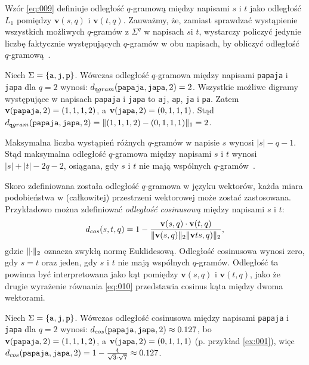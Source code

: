 \documentclass{praca1}
\DeclarePairedDelimiter{\norm}{\lVert}{\rVert}
\begin{document}
Wzór \ref{eq:009} definiuje odległość $q$-gramową między napisami $s$ i $t$ jako odległość $L_1$ pomiędzy $\mathbf{v}(s,q)$ i $\mathbf{v}(t,q)$. Zauważmy, że, zamiast sprawdzać wystąpienie wszystkich możliwych $q$-gramów z $\Sigma^q$ w napisach $s$i $t$, wystarczy policzyć jedynie liczbę faktycznie występujących $q$-gramów w obu napisach, by obliczyć odległość $q$-gramową~\cite{Loo2014:stringdist}.

\begin{example}
\label{ex:001}
Niech $\Sigma = \{\verb|a|, \verb|j|, \verb|p|\}$. Wówczas odległość $q$-gramowa między napisami \verb|papaja| i \verb|japa| dla $q = 2$ wynosi: $d_{\mathtt{q}gram}(\verb|papaja|, \verb|japa|, 2) = 2$. Wszystkie możliwe digramy występujące w napisach  \verb|papaja| i \verb|japa| to \verb|aj|, \verb|ap|, \verb|ja| i \verb|pa|. Zatem $\mathbf{v}( \verb|papaja|,2) = (1, 1, 1, 2)$, a  $\mathbf{v}( \verb|japa|,2) = (0, 1, 1, 1)$. Stąd $d_{\mathtt{q}gram}(\verb|papaja|, \verb|japa|, 2) =  \norm{(1,1,1,2) - (0,1,1,1)}_1 = 2$.
\end{example}


Maksymalna liczba wystąpień różnych $q$-gramów w napisie $s$ wynosi $|s| - q - 1$. Stąd maksymalna odległość $q$-gramowa między napisami $s$ i $t$ wynosi $|s| + |t| - 2q - 2$, osiągana, gdy $s$ i $t$ nie mają wspólnych $q$-gramów~\cite{Loo2014:stringdist}.

Skoro zdefiniowana została odległość $q$-gramowa w języku wektorów, każda miara podobieństwa w (całkowitej) przestrzeni wektorowej może zostać zastosowana. Przykładowo można zdefiniować \emph{odległość cosinusową} między napisami $s$ i $t$:
\begin{equation}
\label{eq:010}
d_{cos}(s,t,q) = 1 - \frac{ \mathbf{v}(s,q) \cdot \mathbf{v}(t,q) }{ \norm{\mathbf{v}(s,q)}_2  \norm{\mathbf{v}ts,q)}_2 },
\end{equation}
gdzie $\norm{\cdot}_2$ oznacza zwykłą normę Euklidesową. Odległość cosinusowa wynosi zero, gdy $s=t$ oraz jeden, gdy $s$ i $t$ nie mają wspólnych $q$-gramów. Odległość ta powinna być interpretowana jako kąt pomiędzy $\mathbf{v}(s,q)$ i $\mathbf{v}(t,q)$, jako że drugie wyrażenie równania \ref{eq:010} przedstawia cosinus kąta między dwoma wektorami.

\begin{example}
Niech $\Sigma = \{\verb|a|, \verb|j|, \verb|p|\}$. Wówczas odległość cosinusowa między napisami \verb|papaja| i \verb|japa| dla $q = 2$ wynosi: $d_{cos}(\verb|papaja|, \verb|japa|, 2) \approx 0.127$, bo $\mathbf{v}( \verb|papaja|,2) = (1, 1, 1, 2)$, a  $\mathbf{v}( \verb|japa|,2) = (0, 1, 1, 1)$ (p. przykład \ref{ex:001}), więc $d_{cos}(\verb|papaja|, \verb|japa|, 2) = 1 - \frac{4}{\sqrt{3}\cdot\sqrt{7}} \approx 0.127$.
\end{example}
\end{document}
